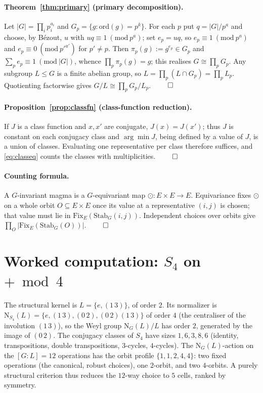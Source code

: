 \documentclass[11pt,a4paper]{article}
\newcommand{\Norm}{\mathrm{N}}
\theoremstyle{plain}
\theoremstyle{definition}
\theoremstyle{remark}
\begin{document}
\paragraph{Theorem~\ref{thm:primary} (primary decomposition).}
Let $|G|=\prod_i p_i^{a_i}$ and $G_p=\{g:\mathrm{ord}(g)=p^k\}$. For each $p$ put
$q=|G|/p^{a}$ and choose, by B\'ezout, $u$ with $uq\equiv 1\ (\mathrm{mod}\
p^{a})$; set $e_p=uq$, so $e_p\equiv 1\ (\mathrm{mod}\ p^{a})$ and
$e_p\equiv 0\ (\mathrm{mod}\ p'^{a'})$ for $p'\neq p$. Then
$\pi_p(g):=g^{e_p}\in G_p$ and $\sum_p e_p\equiv 1\ (\mathrm{mod}\ |G|)$, whence
$\prod_p\pi_p(g)=g$; this realises $G\cong\prod_p G_p$. Any subgroup $L\le G$ is a
finite abelian group, so $L=\prod_p(L\cap G_p)=\prod_p L_p$. Quotienting
factorwise gives $G/L\cong\prod_p G_p/L_p$. $\qed$

\paragraph{Proposition~\ref{prop:classfn} (class-function reduction).}
If $J$ is a class function and $x,x'$ are conjugate, $J(x)=J(x')$; thus $J$ is
constant on each conjugacy class and $\arg\min J$, being defined by a value of
$J$, is a union of classes. Evaluating one representative per class therefore
suffices, and \eqref{eq:classeq} counts the classes with multiplicities. $\qed$

\paragraph{Counting formula.}
A $G$-invariant magma is a $G$-equivariant map $\odot:E\times E\to E$. Equivariance
fixes $\odot$ on a whole orbit $O\subseteq E\times E$ once its value at a
representative $(i,j)$ is chosen; that value must lie in
$\mathrm{Fix}_E(\mathrm{Stab}_G(i,j))$. Independent choices over orbits give
$\prod_O|\mathrm{Fix}_E(\mathrm{Stab}_G(O))|$. $\qed$

\section{Worked computation: \texorpdfstring{$S_4$ on $+\bmod 4$}{S4 on +mod4}}
\label{app:s4}

The structural kernel is $L=\{e,(1\,3)\}$, of order $2$. Its normalizer is
$\Norm_{S_4}(L)=\{e,(1\,3),(0\,2),(0\,2)(1\,3)\}$ of order $4$ (the centraliser
of the involution $(1\,3)$), so the Weyl group $\Norm_G(L)/L$ has order $2$,
generated by the image of $(0\,2)$. The conjugacy classes of $S_4$ have sizes
$1,6,3,8,6$ (identity, transpositions, double transpositions, $3$-cycles,
$4$-cycles). The $\Norm_G(L)$-action on the $[G:L]=12$ operations has the orbit
profile $\{1,1,2,4,4\}$: two fixed operations (the canonical, robust choices),
one $2$-orbit, and two $4$-orbits. A purely structural criterion thus reduces
the $12$-way choice to $5$ cells, ranked by symmetry.
\end{document}

